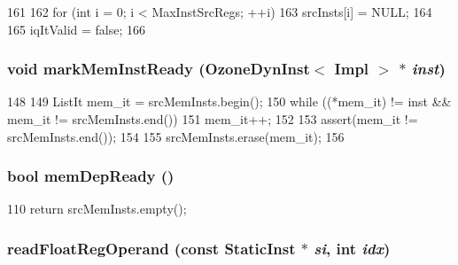 \begin{DoxyCode}
161 {
162     for (int i = 0; i < MaxInstSrcRegs; ++i) {
163         srcInsts[i] = NULL;
164     }
165     iqItValid = false;
166 }
\end{DoxyCode}
\hypertarget{classOzoneDynInst_abf45d56d1eadb12109f0ade4f31ad1c4}{
\subsubsection[{markMemInstReady}]{\setlength{\rightskip}{0pt plus 5cm}void markMemInstReady ({\bf OzoneDynInst}$<$ Impl $>$ $\ast$ {\em inst})}}
\label{classOzoneDynInst_abf45d56d1eadb12109f0ade4f31ad1c4}



\begin{DoxyCode}
148 {
149     ListIt mem_it = srcMemInsts.begin();
150     while ((*mem_it) != inst && mem_it != srcMemInsts.end()) {
151         mem_it++;
152     }
153     assert(mem_it != srcMemInsts.end());
154 
155     srcMemInsts.erase(mem_it);
156 }
\end{DoxyCode}
\hypertarget{classOzoneDynInst_a9edde0cc2b9486174b982c9dd8ff9a5c}{
\subsubsection[{memDepReady}]{\setlength{\rightskip}{0pt plus 5cm}bool memDepReady ()}}
\label{classOzoneDynInst_a9edde0cc2b9486174b982c9dd8ff9a5c}



\begin{DoxyCode}
110 { return srcMemInsts.empty(); }
\end{DoxyCode}
\hypertarget{classOzoneDynInst_a717c88c8c56d79c9ed554ba5992bd8c3}{
\subsubsection[{readFloatRegOperand}]{ readFloatRegOperand (const {\bf StaticInst} $\ast$ {\em si}, \/  int {\em idx})}}
\label{classOzoneDynInst_a717c88c8c56d79c9ed554ba5992bd8c3}



